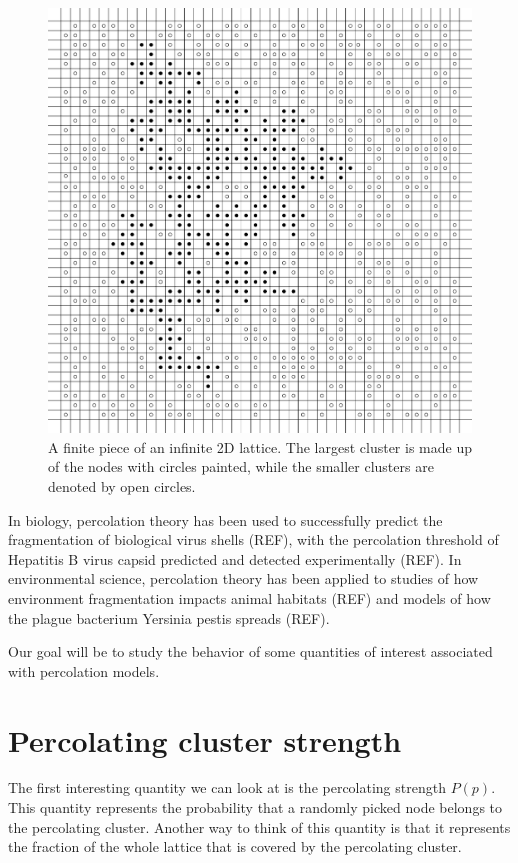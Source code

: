 \begin{figure}[H]
  \includegraphics[width=\linewidth]{Images/2dlattice.png}
  \caption{A finite piece of an infinite 2D lattice. The largest cluster is made up of the nodes with circles painted, while the smaller clusters are denoted by open circles.}
  \label{fig:2dlattice}
\end{figure}


In biology, percolation theory has been used to successfully predict the fragmentation of biological virus shells (REF), with the percolation threshold of Hepatitis B virus capsid predicted and detected experimentally (REF). In environmental science, percolation theory has been applied to studies of how environment fragmentation impacts animal habitats (REF) and models of how the plague bacterium Yersinia pestis spreads (REF).


Our goal will be to study the behavior of some quantities of interest associated with percolation models.


\section{Percolating cluster strength}

The first interesting quantity we can look at is the percolating strength $P(p)$. This quantity  represents the probability that a randomly picked node belongs to the percolating cluster. Another way to think of this quantity is that it represents the fraction of the whole lattice that is covered by the percolating cluster. 

